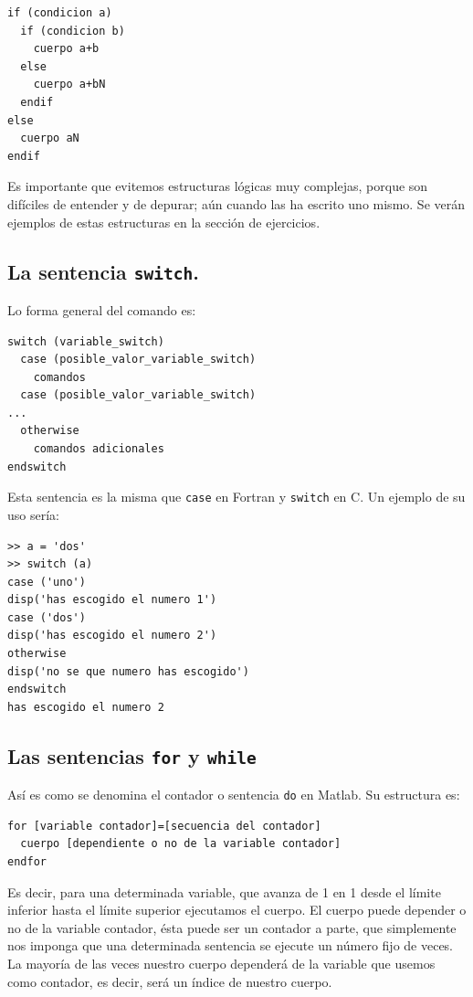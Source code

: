 \begin{lstlisting}
if (condicion a)   
  if (condicion b)   
    cuerpo a+b   
  else   
    cuerpo a+bN   
  endif   
else   
  cuerpo aN   
endif
\end{lstlisting}
Es importante que evitemos estructuras lógicas muy complejas, porque
son difíciles de entender y de depurar; aún cuando las ha escrito uno
mismo. Se verán ejemplos de estas estructuras en la sección de
ejercicios.


\subsection{La sentencia \texttt{switch}.}
Lo forma general del comando es:

\begin{lstlisting}
switch (variable_switch)
  case (posible_valor_variable_switch)
    comandos
  case (posible_valor_variable_switch)
...
  otherwise
    comandos adicionales
endswitch
\end{lstlisting}
Esta sentencia es la misma que \texttt{case} en Fortran y
\texttt{switch} en C. Un ejemplo de su uso sería:

\begin{lstlisting}
>> a = 'dos'
>> switch (a)
case ('uno')
disp('has escogido el numero 1')
case ('dos')
disp('has escogido el numero 2')
otherwise
disp('no se que numero has escogido')
endswitch
has escogido el numero 2
\end{lstlisting}

\subsection{Las sentencias \texttt{for} y \texttt{while}}

Así es como se denomina el contador o sentencia \texttt{do} en Matlab.
Su estructura es:

\begin{lstlisting}
for [variable contador]=[secuencia del contador]
  cuerpo [dependiente o no de la variable contador]
endfor 
\end{lstlisting}
Es decir, para una determinada variable, que avanza de 1 en 1 desde el
límite inferior hasta el límite superior ejecutamos el cuerpo.  El
cuerpo puede depender o no de la variable contador, ésta puede ser un
contador a parte, que simplemente nos imponga que una determinada
sentencia se ejecute un número fijo de veces. La mayoría de las veces
nuestro cuerpo dependerá de la variable que usemos como contador, es
decir, será un índice de nuestro cuerpo.

